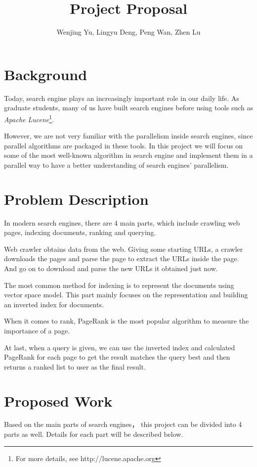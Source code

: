 \documentclass[11pt]{amsart}
\title{Project Proposal}
\author{Wenjing Yu, Lingyu Deng, Peng Wan, Zhen Lu}
\begin{document}
\maketitle
\section{Background}
Today, search engine plays an increasingly important role in our daily life. As graduate students, many of us have built search engines 
before using tools such as \emph{Apache Lucene}\footnote{For more details, see 
http://lucene.apache.org}. 


However, we are not very familiar with the parallelism inside search engines, since parallel algorithms
are packaged in these tools. In this project we will focus on some of the most well-known algorithm in search engine and implement them in a parallel way to have a better understanding of search engines' parallelism.

\section{Problem Description}
In modern search engines, there are 4 main parts, which include crawling web pages, indexing documents, 
ranking and querying. 

Web crawler obtains data from the web. Giving some starting URLs, a crawler downloads the
pages and parse the page to extract the URLs inside the page. And go on to download and parse the new URLs it obtained just now.

The most common method for indexing is to represent the documents using vector space model. This part
mainly focuses on the representation and building an inverted index for documents.

When it comes to rank, PageRank is the most popular algorithm to measure the importance of a page. 

At last, when a query is given, we can use the inverted index and calculated PageRank for each page
to get the result matches the query best and then returns a ranked list to user as the final result.

\section{Proposed Work}
Based on the main parts of search engines， this project can be divided into 4 parts as well. Details
for each part will be described below.
\end{document}
